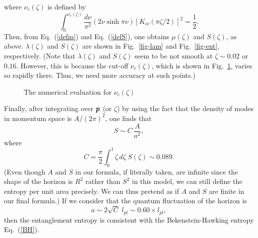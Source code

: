 \documentclass[12pt,epsf]{article}
\def\bmi#1{\mbox{\boldmath $#1$}}
\begin{document}
where $\nu_c(\zeta)$ is defined by
\begin{equation}
\int^{\nu_c(\zeta)}_0 \frac{d\nu}{\pi^2}(2\nu\sinh\pi\nu) 
    \left[K_{i\nu}(\pi\zeta/2)\right]^2=\frac{1}{2}.
\end{equation}
Then, from Eq.~(\ref{defm}) and Eq.~(\ref{defS}),
one obtains $\mu(\zeta)$ and $S(\zeta)$, as above.
$\lambda(\zeta)$ and $S(\zeta)$
are shown in Fig.~\ref{fig-lam} and Fig.~\ref{fig-ent},
respectively.
(Note that $\lambda(\zeta)$ and $S(\zeta)$
seem to be not smooth at $\zeta\sim0.02$ or $0.16$.
However, this is because the cut-off $\nu_c(\zeta)$,
which is shown in Fig.~\ref{fig-cut}, varies
so rapidly there.
Thus, we need more accuracy at such points.)



\begin{figure}
\begin{center}
\leavevmode
\epsfysize=7cm
\caption{The numerical evaluation for $\nu_c(\zeta)$}
\label{fig-cut}
\end{center}
\end{figure}


Finally, after integrating over $\bmi{p}$ (or $\zeta$)
by using the fact that the density of modes in
momentum space is $A/(2\pi)^2$,
one finds that
\begin{equation}
  S\sim C\,\frac{A}{a^2},
\end{equation}
where
\begin{equation}
  C=\frac{\pi}{2}\int^1_0 
    \zeta\, d\zeta \;S(\zeta)\sim 0.089.
\end{equation}
(Even though $A$ and $S$ in our formula,
if literally taken, are infinite since
the shape of the horizon is $R^2$ rather than
$S^2$ in this model, we can still define the
entropy per unit area precisely.
We can thus pretend as if $A$ and $S$ are finite
in our final formula.)
If we consider that the quantum fluctuation of the horizon is
\begin{equation}
  a \sim 2\sqrt{C}\; l_{pl} \sim 0.60 \times l_{pl} ,
\end{equation}
then the entanglement entropy is consistent with 
the Bekenstein-Hawking entropy Eq.~(\ref{BH}).
\end{document}
